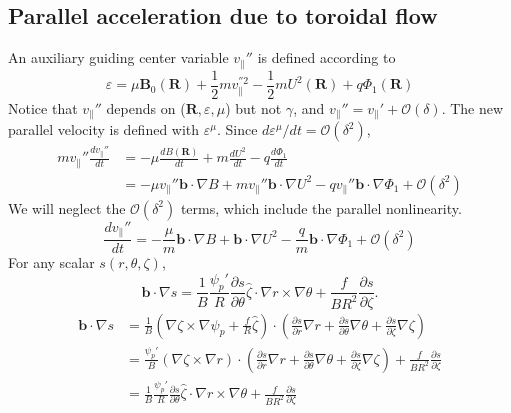 \documentclass[12pt]{article}
\begin{document}
\begin{CJK*}{UTF8}{gbsn}
\newpage
\section{Parallel acceleration due to toroidal flow}
An auxiliary guiding center variable $v_{\parallel}{''}$ is defined according to 
\begin{equation}
    \varepsilon = \mu\mathbf{B_\mathrm{0}(R)} + \frac{1}{2}mv_{\parallel}^{''2} - \frac{1}{2}mU^2\mathbf{(R)} + q\Phi_1\mathbf{(R)}
\end{equation}
Notice that $v_{\parallel}{''}$ depends on ($\mathbf{R},\varepsilon,\mu$) but not $\gamma$, and $v_{\parallel}{''}=v_{\parallel}{'}+\mathcal{O}(\delta)$.
The new parallel velocity is defined with $\varepsilon^{\mu}$. Since $d\varepsilon^{\mu}/dt=\mathcal{O}(\delta^2)$,
\begin{equation}
\begin{split}
    mv_{\parallel}''\frac{dv_{\parallel}''}{dt} &= -\mu\frac{dB\mathbf{(R)}}{dt} + m\frac{dU^2}{dt} - q\frac{d\Phi_1}{dt}\\
    &=-\mu v_{\parallel}''\mathbf{b}\cdot\nabla B + mv_{\parallel}''\mathbf{b}\cdot\nabla U^2 - qv_{\parallel}''
    \mathbf{b}\cdot\nabla\Phi_1 + \mathcal{O}(\delta^2)
\end{split}
\end{equation}
We will neglect the $\mathcal{O}(\delta^2)$ terms, which include the parallel nonlinearity.
\begin{equation}
    \frac{dv_{\parallel}''}{dt} = -\frac{\mu}{m}\mathbf{b}\cdot\nabla B + \mathbf{b}\cdot\nabla U^2 - \frac{q}{m}\mathbf{b}\cdot\nabla\Phi_1 + \mathcal{O}(\delta^2)
\end{equation}
For any scalar $s(r,\theta,\zeta)$,
\begin{equation}
    \mathbf{b}\cdot\nabla s=\frac{1}{B}\frac{\psi_p'}{R}\frac{\partial s}{\partial \theta}\hat{\zeta}\cdot\nabla r \times \nabla\theta
    + \frac{f}{BR^2}\frac{\partial s}{\partial \zeta}.
\end{equation}
{\color{cyan}
\begin{equation*}
\begin{split}
    \mathbf{b}\cdot\nabla s&=\frac{1}{B}(\nabla\zeta\times\nabla\psi_p+\frac{f}{R}\hat{\zeta})\cdot(\frac{\partial s}{\partial r}\nabla r
    +\frac{\partial s}{\partial \theta}\nabla \theta+\frac{\partial s}{\partial \zeta}\nabla \zeta)\\
    &=\frac{\psi_p'}{B}(\nabla\zeta\times\nabla r)\cdot(\frac{\partial s}{\partial r}\nabla r
    +\frac{\partial s}{\partial \theta}\nabla \theta+\frac{\partial s}{\partial \zeta}\nabla \zeta)+\frac{f}{BR^2}\frac{\partial s}{\partial\zeta}\\
    &=\frac{1}{B}\frac{\psi_p'}{R}\frac{\partial s}{\partial \theta}\hat{\zeta}\cdot\nabla r \times \nabla\theta
    + \frac{f}{BR^2}\frac{\partial s}{\partial \zeta}
\end{split}
\end{equation*}
}


\end{CJK*}
\end{document}
